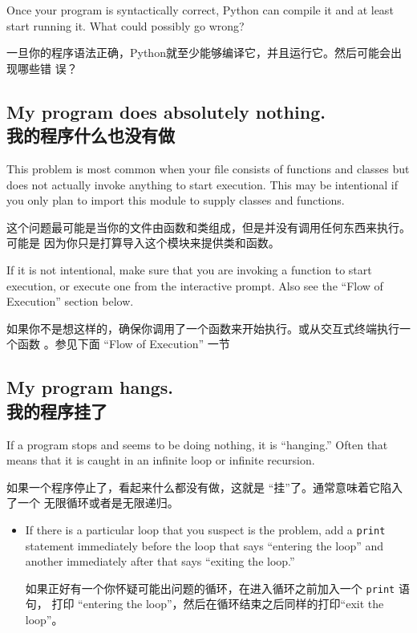 \documentclass[10pt]{book}
\begin{document}
\begin{CJK}{UTF8}{gbsn}
Once your program is syntactically correct,
Python can compile it and at least start running it.  What could
possibly go wrong?

一旦你的程序语法正确，Python就至少能够编译它，并且运行它。然后可能会出现哪些错
误？

\subsection{My program does absolutely nothing.\\我的程序什么也没有做}

This problem is most common when your file consists of functions and
classes but does not actually invoke anything to start execution.
This may be intentional if you only plan to import this module to
supply classes and functions.

这个问题最可能是当你的文件由函数和类组成，但是并没有调用任何东西来执行。可能是
因为你只是打算导入这个模块来提供类和函数。

If it is not intentional, make sure that you
are invoking a function to start execution, or execute one from
the interactive prompt.  Also see the ``Flow of Execution'' section
below.

如果你不是想这样的，确保你调用了一个函数来开始执行。或从交互式终端执行一个函数
。参见下面 ``Flow of Execution'' 一节

\subsection{My program hangs. \\ 我的程序挂了}

If a program stops and seems to be doing nothing, it is ``hanging.''
Often that means that it is caught in an infinite loop or infinite
recursion.

如果一个程序停止了，看起来什么都没有做，这就是 ``挂''了。通常意味着它陷入了一个
无限循环或者是无限递归。

\begin{itemize}

\item If there is a particular loop that you suspect is the
problem, add a {\tt print} statement immediately before the loop that says
``entering the loop'' and another immediately after that says
``exiting the loop.''

如果正好有一个你怀疑可能出问题的循环，在进入循环之前加入一个 {\tt print} 语句，
打印 ``entering the loop''，然后在循环结束之后同样的打印``exit the loop''。


\end{itemize}
\end{CJK}
\end{document}
